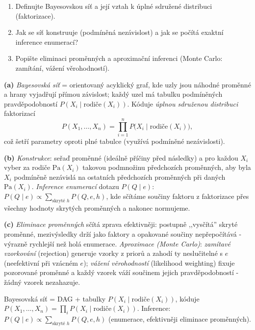 \begin{zadani}
\begin{enumerate}[label=(\alph*)]
  \item {} Definujte Bayesovskou síť a její vztah k úplné sdružené distribuci (faktorizace).
  \item {} Jak se síť konstruuje (podmíněná nezávislost) a jak se počítá exaktní inference enumerací?
  \item {} Popište eliminaci proměnných a aproximační inferenci (Monte Carlo: zamítání, vážení věrohodností).
\end{enumerate}
\end{zadani}

\begin{reseni}
\textbf{(a)} \emph{Bayesovská síť} = orientovaný acyklický graf, kde uzly jsou náhodné proměnné a hrany vyjadřují přímou závislost; každý uzel má tabulku podmíněných pravděpodobností $P(X_i\mid \mathrm{rodiče}(X_i))$. Kóduje \emph{úplnou sdruženou distribuci} faktorizací
\[
P(X_1,\dots,X_n)=\prod_{i=1}^n P\big(X_i\mid \mathrm{rodiče}(X_i)\big),
\]
což šetří parametry oproti plné tabulce (využívá podmíněné nezávislosti).

\textbf{(b)} \emph{Konstrukce}: seřaď proměnné (ideálně příčiny před následky) a pro každou $X_i$ vyber za rodiče $\mathrm{Pa}(X_i)$ takovou podmnožinu předchozích proměnných, aby byla $X_i$ podmíněně nezávislá na ostatních předchozích proměnných při daných $\mathrm{Pa}(X_i)$. \emph{Inference enumerací} dotazu $P(Q\mid e)$: $P(Q\mid e)\propto\sum_{\text{skryté } h}P(Q,e,h)$, kde sčítáme součiny faktoru z faktorizace přes všechny hodnoty skrytých proměnných a nakonec normujeme.

\textbf{(c)} \emph{Eliminace proměnných} sčítá zprava efektivněji: postupně ,,vysčítá'' skryté proměnné, mezivýsledky drží jako faktory a opakované součiny nepřepočítává - výrazně rychlejší než holá enumerace. \emph{Aproximace (Monte Carlo)}: \emph{zamítavé vzorkování} (rejection) generuje vzorky z priorů a zahodí ty neslučitelné s $e$ (neefektivní při vzácném $e$); \emph{vážení věrohodností} (likelihood weighting) fixuje pozorované proměnné a každý vzorek váží součinem jejich pravděpodobností - žádný vzorek nezahazuje.
\end{reseni}

\begin{jadro}
Bayesovská síť = DAG + tabulky $P(X_i\mid\text{rodiče}(X_i))$, kóduje $P(X_1,\dots,X_n)=\prod_i P(X_i\mid\text{rodiče}(X_i))$. Inference: $P(Q\mid e)\propto\sum_{\text{skryté }h}P(Q,e,h)$ (enumerace, efektivněji eliminace proměnných).
\end{jadro}


